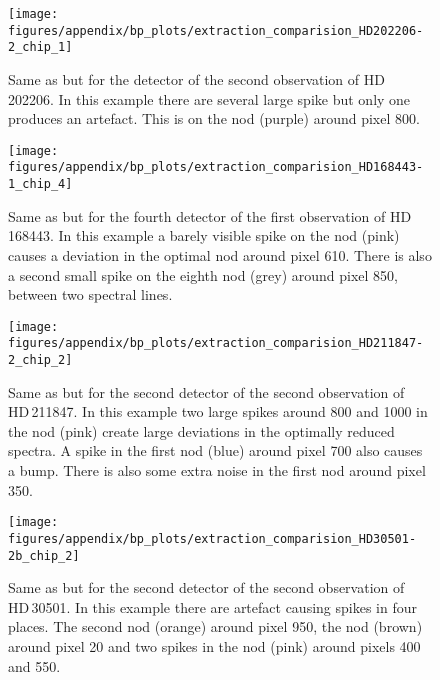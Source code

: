  \begin{figure}
    \centering
    \texttt{[image: figures/appendix/bp\_plots/extraction\_comparision\_HD202206-2\_chip\_1]}
    \caption{Same as  but for the  detector of the second observation of {HD\,202206}. In this example there are several large spike but only one produces an artefact. This is on the  nod (purple) around pixel 800.}
    \label{fig:artefact_example4}
\end{figure}
 \begin{figure}
     \centering
     \texttt{[image: figures/appendix/bp\_plots/extraction\_comparision\_HD168443-1\_chip\_4]}
     \caption{Same as  but for the fourth detector of the first observation of {HD\,168443}. In this example a barely visible spike on the   nod (pink) causes a deviation in the optimal nod around pixel 610. There is also a second small spike on the eighth  nod (grey) around pixel 850, between two spectral lines.}
     \label{fig:artefact_example5}
 \end{figure}
  \begin{figure}
     \centering
     \texttt{[image: figures/appendix/bp\_plots/extraction\_comparision\_HD211847-2\_chip\_2]}
     \caption{Same as  but for the second detector of the second observation of {HD\,211847}. In this example two large spikes around 800 and 1000 in the  nod (pink) create large deviations in the optimally reduced spectra. A spike in the first nod (blue) around pixel 700 also causes a bump. There is also some extra noise in the first nod around pixel 350.}
     \label{fig:artefact_example6}
 \end{figure}
  \begin{figure}
    \centering
    \texttt{[image: figures/appendix/bp\_plots/extraction\_comparision\_HD30501-2b\_chip\_2]}
    \caption{Same as  but for the second detector of the second observation of {HD\,30501}. In this example there are artefact causing spikes in four places. The second nod (orange) around pixel 950, the  nod (brown) around pixel 20 and two spikes in the  nod (pink) around pixels 400 and 550.}
    \label{fig:artefact_example7}
\end{figure}
